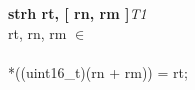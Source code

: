 


\begin{instructionblock}{\imagewidth}%
    \textbf{strh rt, [ rn, rm ]}\hfill\textit{T1}\\
    rt, rn, rm $\in$ \baseregisters\\
    {}\\
    {*}((uint16\_t)(rn + rm)) = rt;
\end{instructionblock}

